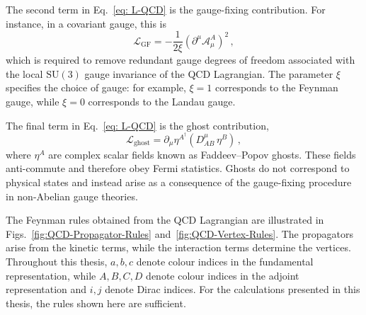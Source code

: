 The second term in Eq.~\eqref{eq: L-QCD} is the gauge-fixing contribution.
For instance, in a covariant gauge, this is
\begin{equation}
    \mathcal{L}_{\mathrm{GF}}
    = -\frac{1}{2\xi} \left( \partial^\mu \mathcal{A}_\mu^{A} \right)^{2}\,,
\end{equation}
which is required to remove redundant gauge degrees of freedom 
associated with the local $\mathrm{SU}(3)$ gauge invariance of the QCD
Lagrangian. The parameter $\xi$ specifies the choice of gauge: for example, 
$\xi = 1$ corresponds to the Feynman gauge, while $\xi = 0$ corresponds to the Landau gauge.

The final term in Eq.~\eqref{eq: L-QCD} is the ghost contribution,
\begin{equation}
\mathcal{L}_\mathrm{ghost} = \partial_\mu \eta^{A^\dagger}(D_{AB}^\mu\,\eta^B)\,,
\end{equation}
where $\eta^A$ are complex scalar fields known as Faddeev--Popov ghosts. 
These fields anti-commute and therefore obey Fermi statistics. 
Ghosts do not correspond to physical states and instead arise as a
consequence of the gauge-fixing procedure in non-Abelian gauge theories.

The Feynman rules obtained from the QCD Lagrangian are illustrated in
Figs.~\ref{fig:QCD-Propagator-Rules} and~\ref{fig:QCD-Vertex-Rules}. The propagators arise from the kinetic terms,
while the interaction terms determine the vertices. Throughout this thesis,
$a,b,c$ denote colour indices in the fundamental representation, while
$A,B,C,D$ denote colour indices in the adjoint representation and $i,j$
denote Dirac indices. For the calculations presented in this thesis, the
rules shown here are sufficient.

